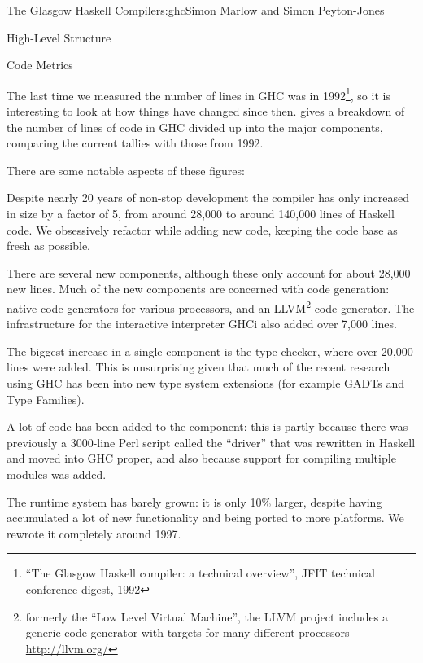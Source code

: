 \begin{aosachapter}{The Glasgow Haskell Compiler}{s:ghc}{Simon Marlow and Simon Peyton-Jones}
\begin{aosasect1}{High-Level Structure}
\begin{aosasect2}{Code Metrics}

The last time we measured the number of lines in GHC was in
1992\footnote{``The Glasgow Haskell compiler: a technical overview'',
  JFIT technical conference digest, 1992}, so it is interesting to
look at how things have changed since then.  
gives a breakdown of the number of lines of code in GHC divided up
into the major components, comparing the current tallies with those
from 1992.

There are some notable aspects of these figures:

\begin{aosaitemize}

\item Despite nearly 20 years of non-stop development the compiler has
  only increased in size by a factor of 5, from around 28,000 to
  around 140,000 lines of Haskell code.  We obsessively refactor while
  adding new code, keeping the code base as fresh as possible.

\item There are several new components, although these only account
  for about 28,000 new lines.  Much of the new components are
  concerned with code generation: native code generators for various
  processors, and an LLVM\footnote{formerly the ``Low Level Virtual
    Machine'', the LLVM project includes a generic code-generator with
    targets for many different processors \url{http://llvm.org/}} code
  generator.  The infrastructure for the interactive interpreter GHCi
  also added over 7,000 lines.

\item The biggest increase in a single component is the type checker,
  where over 20,000 lines were added.  This is unsurprising given that
  much of the recent research using GHC has been into new type system
  extensions (for example GADTs\cite{bib:gadts} and Type
  Families\cite{bib:type-families}).

\item A lot of code has been added to the  component: this
  is partly because there was previously a 3000-line Perl script
  called the ``driver'' that was rewritten in Haskell and moved into
  GHC proper, and also because support for compiling multiple modules
  was added.

\item The runtime system has barely grown: it is only 10\% larger,
  despite having accumulated a lot of new functionality and being
  ported to more platforms.  We rewrote it completely around 1997.


\end{aosaitemize}
\end{aosasect2}
\end{aosasect1}
\end{aosachapter}
